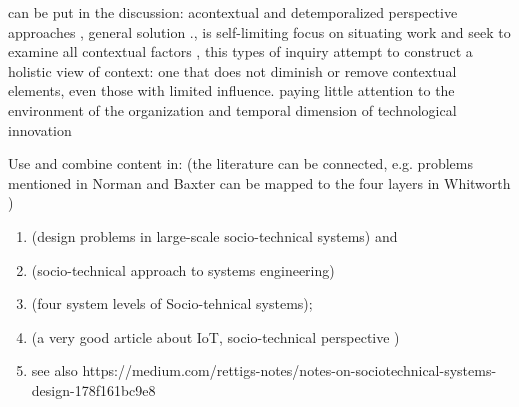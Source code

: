 \begin{svgraybox}
can be put in the discussion: 
acontextual and detemporalized perspective approaches , general solution ., is self-limiting 
focus on situating work and seek to examine all contextual factors , this types of inquiry attempt to construct a holistic view of context: one that does not diminish or remove contextual elements, even those with limited influence. 
paying little attention to the environment of the organization and temporal dimension of technological innovation  \cite{Sawyer2014}
\end{svgraybox}


\begin{svgraybox}
Use and combine content in: (the literature can be connected, e.g. problems mentioned in Norman and Baxter  can be mapped to the four layers in Whitworth )
\begin{enumerate}
\item \cite{Norman2015} (design problems in large-scale socio-technical systems) and 
\item \cite{Baxter2011} (socio-technical approach to systems engineering)
\item \cite{Whitworth2009} (four system levels of Socio-tehnical systems); 
\item \cite{Shin2014} (a very good article about IoT, socio-technical perspective )
\item see also https://medium.com/rettigs-notes/notes-on-sociotechnical-systems-design-178f161bc9e8 
\end{enumerate}
\end{svgraybox}

